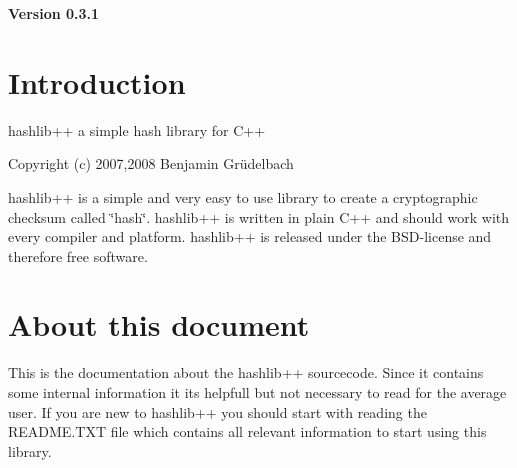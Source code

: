 {\bfseries Version 0.3.1}\hypertarget{main_intro}{}\section{Introduction}\label{main_intro}
hashlib++ a simple hash library for C++ \par
 Copyright (c) 2007,2008 Benjamin Gr\"{u}delbach

hashlib++ is a simple and very easy to use library to create a cryptographic checksum called \char`\"{}hash\char`\"{}. hashlib++ is written in plain C++ and should work with every compiler and platform. hashlib++ is released under the BSD-\/license and therefore free software.\hypertarget{main_about}{}\section{About this document}\label{main_about}
This is the documentation about the hashlib++ sourcecode. Since it contains some internal information it its helpfull but not necessary to read for the average user. If you are new to hashlib++ you should start with reading the README.TXT file which contains all relevant information to start using this library. 